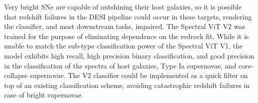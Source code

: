 Very bright SNe are capable of outshining their host galaxies, so it is possible that 
redshift failures in the DESI pipeline could occur in these targets, rendering the classifier, and most downstream tasks, 
impaired. The Spectral ViT V2 was trained for the purpose of eliminating dependence on the redrock fit.
While it is unable to match the sub-type classification power of the Spectral ViT V1, the 
model exhibits high recall, high precision binary classification, and good precision in the classification of the spectra of host galaxies, Type Ia supernovae, and core-collapse supernovae. 
The V2 classifier could be implemented as a quick filter on top of an existing classification scheme, avoiding catastrophic redshift failures in case of bright supernovae.